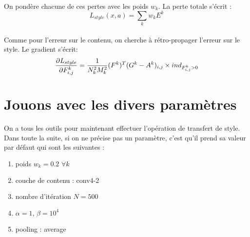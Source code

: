 \documentclass{article}
\begin{document}
\paragraph*{}
On pondère chacune de ces pertes avec les poids $w_k$.  La perte totale s'écrit :
\begin{equation}
L_{style}(x, a) = \sum_k w_k E^k
\end{equation}
\paragraph*{}
Comme pour l'erreur sur le contenu, on cherche à rétro-propager l'erreur sur le style. Le gradient s'écrit:
\begin{equation}
\pdv{L_{style}}{F_{i,j}^k} = \frac{1}{N_k^2 M_k^2}(F^k)^T(G^k-A^k)_{i,j} \times ind_{F_{i,j}^k > 0}
\end{equation}

\section{Jouons avec les divers paramètres}
\paragraph*{}
On a tous les outils pour maintenant effectuer l'opération de transfert de style. Dans toute la suite, si on ne précise pas un paramètre, c'est qu'il prend sa valeur par défaut qui sont les suivantes :
\begin{enumerate}
\item poids $w_k = 0.2$  $\forall k$
\item couche de contenu : conv4-2
\item nombre d'itération $N = 500$
\item $\alpha = 1$, $\beta = 10^4$
\item pooling : average
\end{enumerate}
\end{document}
